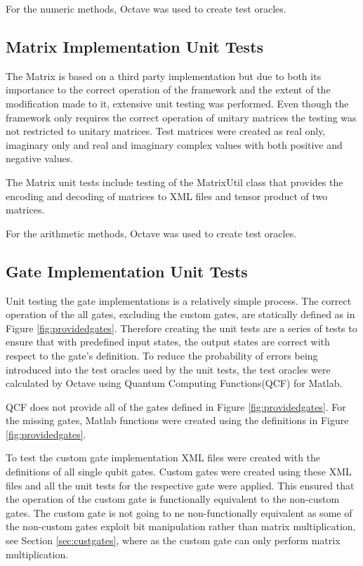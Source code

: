 For the numeric methods, Octave\cite{octweb} was used to create test oracles.

\subsection{Matrix Implementation Unit Tests}
The Matrix is based on a third party implementation but due to both its importance to the correct operation of the framework and the extent of the modification made to it, extensive unit testing was performed.
Even though the framework only requires the correct operation of unitary matrices the testing was not restricted to unitary matrices.
Test matrices were created as real only,  imaginary only and real and imaginary complex values with both positive and negative values.

The Matrix unit tests include testing of the MatrixUtil class that provides the encoding and decoding of matrices to XML files and tensor product of two matrices.

For the arithmetic methods, Octave\cite{octweb} was used to create test oracles.

\subsection{Gate Implementation Unit Tests}
\label{sec:gatetests}
Unit testing the gate implementations is a relatively simple process.
The correct operation of the all gates, excluding the custom gates, are statically defined as in Figure \ref{fig:providedgates}.
Therefore creating the unit tests are a series of tests to ensure that with predefined input states, the output states are correct with respect to the gate's definition.
To reduce the probability of errors being introduced into the test oracles used by the unit tests, the test oracles were calculated by Octave\cite{octweb} using Quantum Computing Functions(QCF) for Matlab\cite{qcfweb}.

QCF does not provide all of the gates defined in Figure \ref{fig:providedgates}.
For the missing gates, Matlab functions were created using the definitions in Figure \ref{fig:providedgates}.

To test the custom gate implementation XML files were created with the definitions of all single qubit gates.
Custom gates were created using these XML files and all the unit tests for the respective gate were applied.
This ensured that the operation of the custom gate is functionally equivalent to the non-custom gates.
The custom gate is not going to ne non-functionally equivalent as some of the non-custom gates exploit bit manipulation rather than matrix multiplication, see Section \ref{sec:custgates}, where as the custom gate can only perform matrix multiplication.

